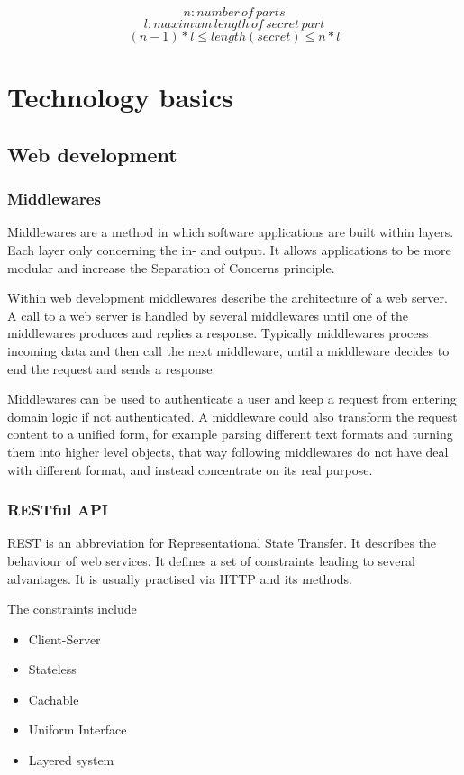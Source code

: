 $$n: number\,of\,parts$$
$$l: maximum\,length\,of\,secret\,part$$
$$(n - 1) * l \leq length(secret) \leq n * l$$

\chapter{Technology basics}
\section{Web development}
\subsection{Middlewares}

Middlewares are a method in which software applications are built within
layers. Each layer only concerning the in- and output. It allows applications
to be more modular and increase the Separation of Concerns principle.

Within web development middlewares describe the architecture of a web server.  A
call to a web server is handled by several middlewares until one of the
middlewares produces and replies a response. Typically middlewares process
incoming data and then call the next middleware, until a middleware decides to
end the request and sends a response.

Middlewares can be used to authenticate a user and keep a request from entering
domain logic if not authenticated. A middleware could also transform the
request content to a unified form, for example parsing different text formats
and turning them into higher level objects, that way following middlewares do
not have deal with different format, and instead concentrate on its real
purpose.

\subsection{RESTful API}

REST is an abbreviation for Representational State Transfer. It describes the
behaviour of web services. It defines a set of constraints leading to several
advantages. It is usually practised via HTTP and its methods.

The constraints include

\begin{itemize}
  \item{Client-Server}
  \item{Stateless}
  \item{Cachable}
  \item{Uniform Interface}
  \item{Layered system}
\end{itemize}
\cite{rest_style}

